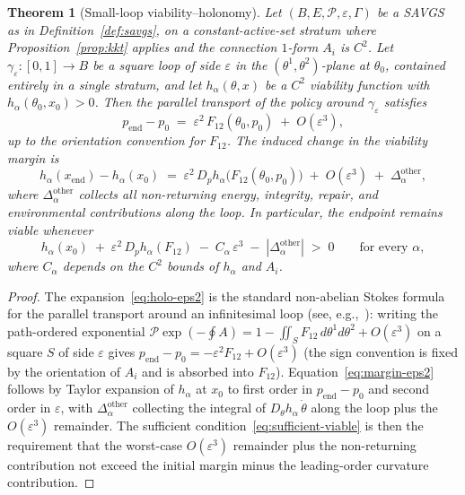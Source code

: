 \documentclass[11pt,a4paper]{article}
\theoremstyle{plain}
\newtheorem{theorem}{Theorem}[section]
\theoremstyle{definition}
\theoremstyle{remark}
\begin{document}
\begin{theorem}[Small-loop viability--holonomy]\label{thm:smallloop}
Let $(B, E, \mathcal P, \varepsilon, \Gamma)$ be a SAVGS as in
Definition~\ref{def:savgs}, on a constant-active-set stratum where
Proposition~\ref{prop:kkt} applies and the connection $1$-form $A_i$
is $C^2$. Let $\gamma_\varepsilon : [0,1] \to B$ be a square loop
of side $\varepsilon$ in the $(\theta^1, \theta^2)$-plane at
$\theta_0$, contained entirely in a single stratum, and let
$h_\alpha(\theta, x)$ be a $C^2$ viability function with
$h_\alpha(\theta_0, x_0) > 0$. Then the parallel transport of the
policy around $\gamma_\varepsilon$ satisfies
\begin{equation}\label{eq:holo-eps2}
  p_{\mathrm{end}} - p_0 \;=\; \varepsilon^2\,F_{12}(\theta_0, p_0) \;+\; O(\varepsilon^3),
\end{equation}
up to the orientation convention for $F_{12}$. The induced change in
the viability margin is
\begin{equation}\label{eq:margin-eps2}
  h_\alpha(x_{\mathrm{end}}) - h_\alpha(x_0)
  \;=\; \varepsilon^2\,D_p h_\alpha\bigl(F_{12}(\theta_0, p_0)\bigr)
  \;+\; O(\varepsilon^3) \;+\; \Delta_\alpha^{\mathrm{other}},
\end{equation}
where $\Delta_\alpha^{\mathrm{other}}$ collects all non-returning
energy, integrity, repair, and environmental contributions along the
loop. In particular, the endpoint remains viable whenever
\begin{equation}\label{eq:sufficient-viable}
  h_\alpha(x_0) \;+\; \varepsilon^2\,D_p h_\alpha(F_{12})
  \;-\; C_\alpha\,\varepsilon^3 \;-\; |\Delta_\alpha^{\mathrm{other}}|
  \;>\; 0
  \qquad\text{for every }\alpha,
\end{equation}
where $C_\alpha$ depends on the $C^2$ bounds of $h_\alpha$ and $A_i$.
\end{theorem}

\begin{proof}
The expansion~\eqref{eq:holo-eps2} is the standard non-abelian
Stokes formula for the parallel transport around an infinitesimal
loop (see, e.g.,~\cite{kobayashinomizu1969,misner1973}): writing
the path-ordered exponential
$\mathcal P\exp(-\oint A) = 1 - \iint_S F_{12}\,d\theta^1 d\theta^2
+ O(\varepsilon^3)$ on a square $S$ of side $\varepsilon$ gives
$p_{\mathrm{end}} - p_0 = -\varepsilon^2 F_{12} + O(\varepsilon^3)$
(the sign convention is fixed by the orientation of $A_i$ and is
absorbed into $F_{12}$). Equation~\eqref{eq:margin-eps2} follows by
Taylor expansion of $h_\alpha$ at $x_0$ to first order in
$p_{\mathrm{end}} - p_0$ and second order in $\varepsilon$, with
$\Delta_\alpha^{\mathrm{other}}$ collecting the integral of
$D_\theta h_\alpha\,\dot\theta$ along the loop plus the
$O(\varepsilon^3)$ remainder. The sufficient
condition~\eqref{eq:sufficient-viable} is then the requirement that
the worst-case $O(\varepsilon^3)$ remainder plus the non-returning
contribution not exceed the initial margin minus the leading-order
curvature contribution.
\end{proof}
\end{document}
